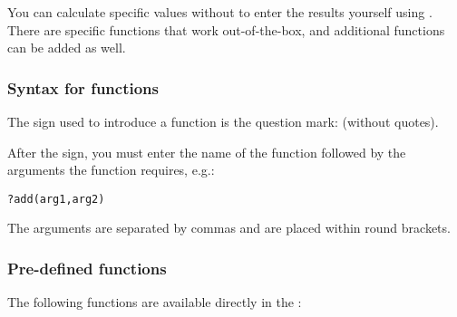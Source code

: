 
You can calculate specific values without to enter the results yourself  using . There are specific functions that work out-of-the-box, and additional functions can be added as well. 

\subsubsection{Syntax for functions}
The sign used to introduce a function is the question mark:  (without quotes). 

After the sign, you must enter the name of the function followed by the arguments the function requires, e.g.:

\verb+?add(arg1,arg2)+

The arguments are separated by commas and are placed within round brackets. 

\subsubsection{Pre-defined functions}
The following functions are available directly in the \ite{}:

